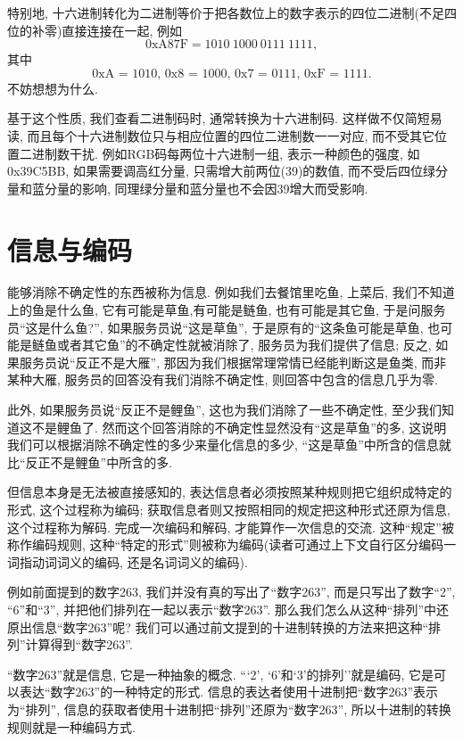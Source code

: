         特别地, 十六进制转化为二进制等价于把各数位上的数字表示的四位二进制(不足四位的补零)直接连接在一起, 例如 
            \[ \textrm{0xA87F} = 1010 \ 1000 \ 0111 \ 1111, \] 
        其中 
            \[ \textrm{0xA = 1010, 0x8 = 1000, 0x7 = 0111, 0xF = 1111}. \]
        不妨想想为什么.

        基于这个性质, 我们查看二进制码时, 通常转换为十六进制码. 这样做不仅简短易读, 而且每个十六进制数位只与相应位置的四位二进制数一一对应, 而不受其它位置二进制数干扰. 例如RGB码每两位十六进制一组, 表示一种颜色的强度, 如0x39C5BB, 如果需要调高红分量, 只需增大前两位(39)的数值, 而不受后四位绿分量和蓝分量的影响, 同理绿分量和蓝分量也不会因39增大而受影响.

    \section{信息与编码}
        能够消除不确定性的东西被称为信息. 例如我们去餐馆里吃鱼, 上菜后, 我们不知道上的鱼是什么鱼, 它有可能是草鱼,有可能是鲢鱼, 也有可能是其它鱼, 于是问服务员``这是什么鱼?'', 如果服务员说``这是草鱼'', 于是原有的``这条鱼可能是草鱼, 也可能是鲢鱼或者其它鱼''的不确定性就被消除了, 服务员为我们提供了信息; 反之, 如果服务员说``反正不是大雁'', 那因为我们根据常理常情已经能判断这是鱼类, 而非某种大雁, 服务员的回答没有我们消除不确定性, 则回答中包含的信息几乎为零.
        
        此外, 如果服务员说``反正不是鲤鱼'', 这也为我们消除了一些不确定性, 至少我们知道这不是鲤鱼了. 然而这个回答消除的不确定性显然没有``这是草鱼''的多, 这说明我们可以根据消除不确定性的多少来量化信息的多少, ``这是草鱼''中所含的信息就比``反正不是鲤鱼''中所含的多. 
        
        但信息本身是无法被直接感知的, 表达信息者必须按照某种规则把它组织成特定的形式, 这个过程称为编码; 获取信息者则又按照相同的规定把这种形式还原为信息, 这个过程称为解码. 完成一次编码和解码, 才能算作一次信息的交流. 这种``规定''被称作编码规则, 这种``特定的形式''则被称为编码(读者可通过上下文自行区分编码一词指动词词义的编码, 还是名词词义的编码).

        例如前面提到的数字263, 我们并没有真的写出了``数字263'', 而是只写出了数字``2'', ``6''和``3'', 并把他们排列在一起以表示``数字263''. 那么我们怎么从这种``排列''中还原出信息``数字263''呢? 我们可以通过前文提到的十进制转换的方法来把这种``排列''计算得到``数字263''. 

        ``数字263''就是信息, 它是一种抽象的概念. ```2', `6'和`3'的排列''就是编码, 它是可以表达``数字263''的一种特定的形式. 信息的表达者使用十进制把``数字263''表示为``排列'', 信息的获取者使用十进制把``排列''还原为``数字263'', 所以十进制的转换规则就是一种编码方式.

